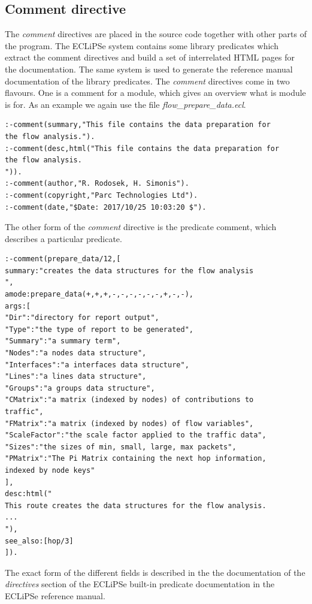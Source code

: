 \documentclass[a4paper,12pt]{report}
\begin{document}
\subsection{Comment directive}
The {\it comment} directives are placed in the source code together with other parts of the program. The ECLiPSe system contains some library predicates which extract the comment directives and build a set of interrelated HTML pages for the documentation. The same system is used to generate the reference manual documentation of the library predicates. The {\it comment} directives come in two flavours. One is a comment for a module, which gives an overview what is module is for. As an example we again use the file {\it flow\_prepare\_data.ecl}.
{\small
\begin{verbatim}
:-comment(summary,"This file contains the data preparation for 
the flow analysis.").
:-comment(desc,html("This file contains the data preparation for 
the flow analysis.
")).
:-comment(author,"R. Rodosek, H. Simonis").
:-comment(copyright,"Parc Technologies Ltd").
:-comment(date,"$Date: 2017/10/25 10:03:20 $").
\end{verbatim}
}
The other form of the {\it comment} directive is the predicate comment, which describes a particular predicate.
{\small
\begin{verbatim}
:-comment(prepare_data/12,[
summary:"creates the data structures for the flow analysis
",
amode:prepare_data(+,+,+,-,-,-,-,-,-,+,-,-),
args:[
"Dir":"directory for report output",
"Type":"the type of report to be generated",
"Summary":"a summary term",
"Nodes":"a nodes data structure",
"Interfaces":"a interfaces data structure",
"Lines":"a lines data structure",
"Groups":"a groups data structure",
"CMatrix":"a matrix (indexed by nodes) of contributions to 
traffic",
"FMatrix":"a matrix (indexed by nodes) of flow variables",
"ScaleFactor":"the scale factor applied to the traffic data",
"Sizes":"the sizes of min, small, large, max packets",
"PMatrix":"The Pi Matrix containing the next hop information, 
indexed by node keys"
],
desc:html("
This route creates the data structures for the flow analysis. 
...
"),
see_also:[hop/3]
]).

\end{verbatim}
}
The exact form of the different fields is described in the the documentation of the {\it directives} section of the ECLiPSe built-in predicate documentation in the ECLiPSe reference manual.
\end{document}
